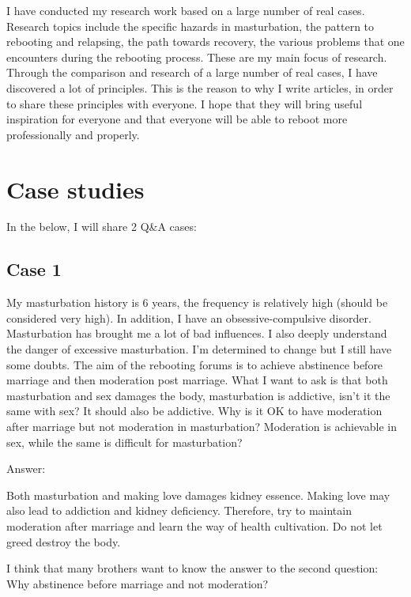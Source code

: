 \documentclass[
]{book}
\begin{document}
I have conducted my research work based on a large number of real cases. Research topics include the specific hazards in masturbation, the pattern to rebooting and relapsing, the path towards recovery, the various problems that one encounters during the rebooting process. These are my main focus of research. Through the comparison and research of a large number of real cases, I have discovered a lot of principles. This is the reason to why I write articles, in order to share these principles with everyone. I hope that they will bring useful inspiration for everyone and that everyone will be able to reboot more professionally and properly.

\hypertarget{case-studies-3}{%
\section{Case studies}\label{case-studies-3}}

In the below, I will share 2 Q\&A cases:

\hypertarget{case-1-3}{%
\subsection{Case 1}\label{case-1-3}}

My masturbation history is 6 years, the frequency is relatively high (should be considered very high). In addition, I have an obsessive-compulsive disorder. Masturbation has brought me a lot of bad influences. I also deeply understand the danger of excessive masturbation. I'm determined to change but I still have some doubts. The aim of the rebooting forums is to achieve abstinence before marriage and then moderation post marriage. What I want to ask is that both masturbation and sex damages the body, masturbation is addictive, isn't it the same with sex? It should also be addictive. Why is it OK to have moderation after marriage but not moderation in masturbation? Moderation is achievable in sex, while the same is difficult for masturbation?

Answer:

Both masturbation and making love damages kidney essence. Making love may also lead to addiction and kidney deficiency. Therefore, try to maintain moderation after marriage and learn the way of health cultivation. Do not let greed destroy the body.

I think that many brothers want to know the answer to the second question: Why abstinence before marriage and not moderation?
\end{document}
